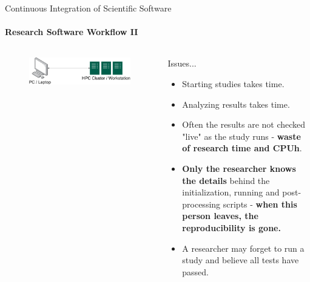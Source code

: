 \begin{frame}{Continuous Integration of Scientific Software}
    \framesubtitle{Research Software Workflow II} 
    \vfill

    \begin{columns}
        \begin{column}[c]{0.5\textwidth}
            \begin{figure}
                \centering
                \includegraphics[width=\columnwidth]{figures/workflow-overview.png}
            \end{figure}
        \end{column}
        \begin{column}[c]{0.5\textwidth}
            Issues...
            \begin{itemize}
                \item Starting studies takes time. 
                \item Analyzing results takes time. 
                \item Often the results are not checked "live" as the study runs - \textbf{waste of research time and CPUh}. 
                \item \textbf{Only the researcher knows the details} behind the initialization, running and post-processing scripts - \textbf{when this person leaves, the reproducibility is gone.} 
                \item A researcher may forget to run a study and believe all tests have passed.
            \end{itemize}
        \end{column}
    \end{columns}


\end{frame}


